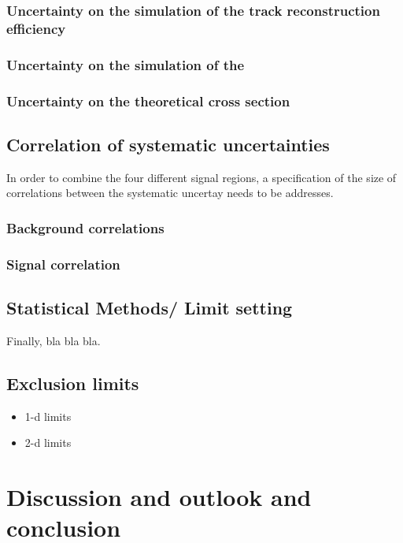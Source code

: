 \subsection*{Uncertainty on the simulation of the track reconstruction efficiency}
\subsection*{Uncertainty on the simulation of the \ias}
\subsection*{Uncertainty on the theoretical cross section}

\section{Correlation of systematic uncertainties}
In order to combine the four different signal regions, a specification of the size of correlations between the systematic uncertay needs to be addresses.

\subsection*{Background correlations}
\subsection*{Signal correlation}
\section{Statistical Methods/ Limit setting}

Finally, bla bla bla.
\section{Exclusion limits}
\begin{itemize}
\item 1-d limits
\item 2-d limits
\end{itemize}


\chapter{Discussion and outlook and conclusion}
\label{sec:Discussion}
